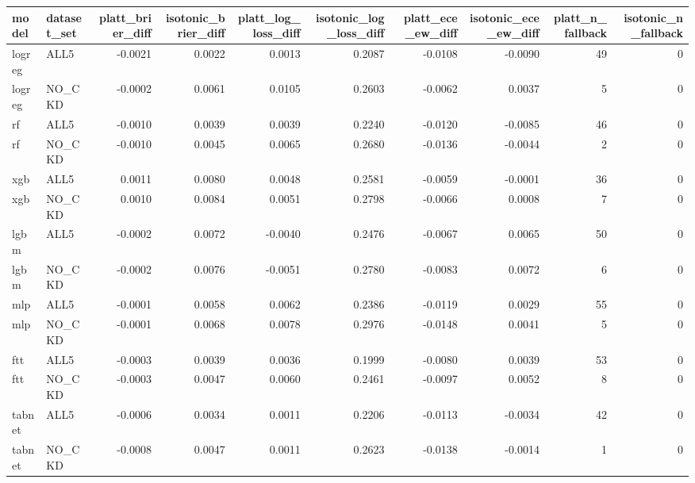 \begin{tabular}{llrrrrrrrr}
\toprule
model & dataset\_set & platt\_brier\_diff & isotonic\_brier\_diff & platt\_log\_loss\_diff & isotonic\_log\_loss\_diff & platt\_ece\_ew\_diff & isotonic\_ece\_ew\_diff & platt\_n\_fallback & isotonic\_n\_fallback \\
\midrule
logreg & ALL5 & -0.0021 & 0.0022 & 0.0013 & 0.2087 & -0.0108 & -0.0090 & 49 & 0 \\
logreg & NO\_CKD & -0.0002 & 0.0061 & 0.0105 & 0.2603 & -0.0062 & 0.0037 & 5 & 0 \\
rf & ALL5 & -0.0010 & 0.0039 & 0.0039 & 0.2240 & -0.0120 & -0.0085 & 46 & 0 \\
rf & NO\_CKD & -0.0010 & 0.0045 & 0.0065 & 0.2680 & -0.0136 & -0.0044 & 2 & 0 \\
xgb & ALL5 & 0.0011 & 0.0080 & 0.0048 & 0.2581 & -0.0059 & -0.0001 & 36 & 0 \\
xgb & NO\_CKD & 0.0010 & 0.0084 & 0.0051 & 0.2798 & -0.0066 & 0.0008 & 7 & 0 \\
lgbm & ALL5 & -0.0002 & 0.0072 & -0.0040 & 0.2476 & -0.0067 & 0.0065 & 50 & 0 \\
lgbm & NO\_CKD & -0.0002 & 0.0076 & -0.0051 & 0.2780 & -0.0083 & 0.0072 & 6 & 0 \\
mlp & ALL5 & -0.0001 & 0.0058 & 0.0062 & 0.2386 & -0.0119 & 0.0029 & 55 & 0 \\
mlp & NO\_CKD & -0.0001 & 0.0068 & 0.0078 & 0.2976 & -0.0148 & 0.0041 & 5 & 0 \\
ftt & ALL5 & -0.0003 & 0.0039 & 0.0036 & 0.1999 & -0.0080 & 0.0039 & 53 & 0 \\
ftt & NO\_CKD & -0.0003 & 0.0047 & 0.0060 & 0.2461 & -0.0097 & 0.0052 & 8 & 0 \\
tabnet & ALL5 & -0.0006 & 0.0034 & 0.0011 & 0.2206 & -0.0113 & -0.0034 & 42 & 0 \\
tabnet & NO\_CKD & -0.0008 & 0.0047 & 0.0011 & 0.2623 & -0.0138 & -0.0014 & 1 & 0 \\
\bottomrule
\end{tabular}
